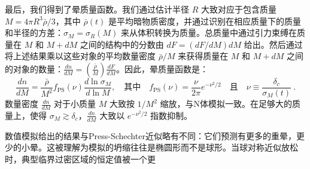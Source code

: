 最后，我们得到了晕质量函数。我们通过估计半径 \( R \) 大致对应于包含质量 \( M = 4\pi R^3 \bar{\rho}/3 \)，其中 \( \bar{\rho}(t) \) 是平均暗物质密度，并通过识别在相应质量下的质量和半径的方差：\( \sigma_M = \sigma_R(M) \) 来从体积转换为质量。总质量中通过引力束缚在质量在 \( M \) 和 \( M + dM \) 之间的结构中的分数由 \( dF = (dF/dM)dM \) 给出。然后通过将上述结果乘以这些对象的平均数量密度 \( \bar{\rho}/M \) 来获得质量在 \( M \) 和 \( M+dM \) 之间的对象的数量：\( \frac{dn}{dM} = \left(\frac{\bar{\rho}}{M}\right) \frac{dF}{dM} \)。因此，晕质量函数是：
\begin{equation}
\frac{dn}{dM} = \frac{\bar{\rho}}{M^2} f_{\text{PS}}(\nu) \frac{d\ln \sigma_M}{d\ln M}, \quad \text{其中} \quad f_{\text{PS}}(\nu) = \frac{\nu}{2\pi} e^{-\nu^2/2} \quad \text{且} \quad \nu \equiv \frac{\delta_c}{\sigma_M(t)}~.
\end{equation}
数量密度 \( \frac{dn}{dM} \) 对于小质量 \( M \) 大致按 \( 1/M^2 \) 缩放，与N体模拟一致。在足够大的质量上，使得 \( \sigma_M \gtrsim \delta_c \)，\( \frac{dn}{dM} \) 大致以 \( e^{-\nu^2/2} \) 指数抑制。

数值模拟给出的结果与Press-Schechter近似略有不同：它们预测有更多的重晕，更少的小晕。这被理解为模拟的坍缩往往是椭圆形而不是球形。当球对称近似放松时，典型临界过密区域的恒定值被一个更 







